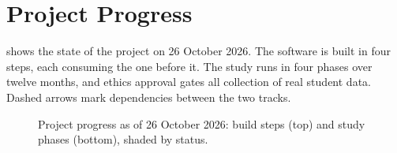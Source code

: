 \chapter{Project Progress}
\label{app:progress}

 shows the state of the project on 26 October 2026.
The software is built in four steps, each consuming the one before it. The
study runs in four phases over twelve months, and ethics approval gates all
collection of real student data. Dashed arrows mark dependencies between the
two tracks.

\begin{figure}[H]
  \centering
  \caption{Project progress as of 26 October 2026: build steps (top) and study
  phases (bottom), shaded by status.}
  \label{fig:phase-progress}
\end{figure}
